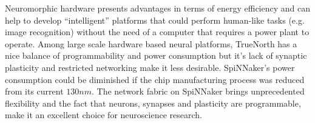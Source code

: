 Neuromorphic hardware presents advantages in terms of energy efficiency and can help to develop ``intelligent'' platforms that could perform human-like tasks (e.g. image recognition) without the need of a computer that requires a power plant to operate. Among large scale hardware based neural platforms, TrueNorth has a nice balance of programmability and power consumption but it's lack of synaptic plasticity and restricted networking make it less desirable. 
SpiNNaker's power consumption could be diminished if the chip manufacturing process was reduced from its current $130 nm$. The network fabric on SpiNNaker brings unprecedented flexibility and the fact that neurons, synapses and plasticity are programmable, make it an excellent choice for neuroscience research.